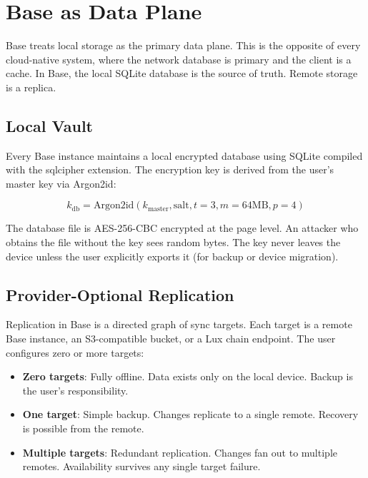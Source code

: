 \section{Base as Data Plane}

\label{sec:dataplane}

Base treats local storage as the primary data plane. This is the opposite of
every cloud-native system, where the network database is primary and the client
is a cache. In Base, the local SQLite database is the source of truth. Remote
storage is a replica.

\subsection{Local Vault}

Every Base instance maintains a local encrypted database using SQLite compiled
with the sqlcipher extension. The encryption key is derived from the user's
master key via Argon2id:

\begin{equation}
k_{\text{db}} = \text{Argon2id}(k_{\text{master}}, \text{salt}, t=3, m=64\text{MB}, p=4)
\end{equation}

The database file is AES-256-CBC encrypted at the page level. An attacker who
obtains the file without the key sees random bytes. The key never leaves the
device unless the user explicitly exports it (for backup or device migration).

\subsection{Provider-Optional Replication}

Replication in Base is a directed graph of sync targets. Each target is a
remote Base instance, an S3-compatible bucket, or a Lux chain endpoint. The
user configures zero or more targets:

\begin{itemize}[leftmargin=1.1em]
    \item \textbf{Zero targets}: Fully offline. Data exists only on the local
    device. Backup is the user's responsibility.
    \item \textbf{One target}: Simple backup. Changes replicate to a single
    remote. Recovery is possible from the remote.
    \item \textbf{Multiple targets}: Redundant replication. Changes fan out to
    multiple remotes. Availability survives any single target failure.
\end{itemize}

